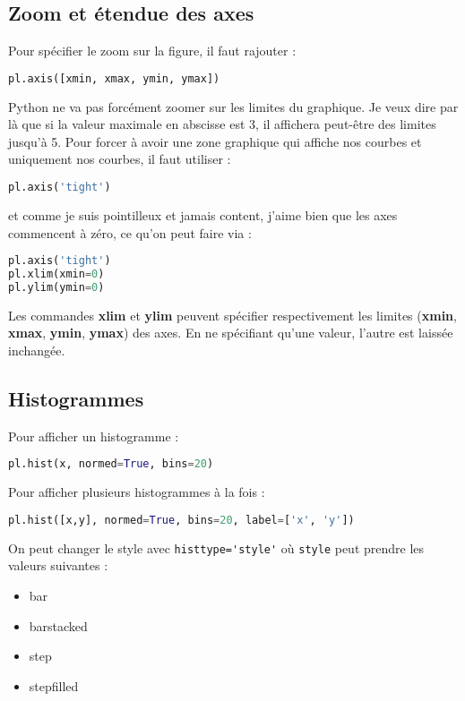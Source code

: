 \documentclass[a4paper,twoside]{article}
\begin{document}
\subsection{Zoom et étendue des axes}

Pour spécifier le zoom sur la figure, il faut rajouter :
\begin{lstlisting}[language=python]
pl.axis([xmin, xmax, ymin, ymax])
\end{lstlisting}

Python ne va pas forcément zoomer sur les limites du graphique. Je veux dire par là que si la valeur maximale en abscisse est 3, il affichera peut-être des limites jusqu'à 5. Pour forcer à avoir une zone graphique qui affiche nos courbes et uniquement nos courbes, il faut utiliser :
\begin{lstlisting}[language=python]
pl.axis('tight')
\end{lstlisting}

et comme je suis pointilleux et jamais content, j'aime bien que les axes commencent à zéro, ce qu'on peut faire via :
\begin{lstlisting}[language=python]
pl.axis('tight')
pl.xlim(xmin=0)
pl.ylim(ymin=0)
\end{lstlisting}

Les commandes \textbf{xlim} et \textbf{ylim} peuvent spécifier respectivement les limites (\textbf{xmin}, \textbf{xmax}, \textbf{ymin}, \textbf{ymax}) des axes. En ne spécifiant qu'une valeur, l'autre est laissée inchangée.


\subsection{Histogrammes}
Pour afficher un histogramme :
\begin{lstlisting}[language=python]
pl.hist(x, normed=True, bins=20)
\end{lstlisting}

Pour afficher plusieurs histogrammes à la fois :
\begin{lstlisting}[language=python]
pl.hist([x,y], normed=True, bins=20, label=['x', 'y'])
\end{lstlisting}

\bigskip

On peut changer le style avec \verb|histtype='style'| où \verb|style| peut prendre les valeurs suivantes :
\begin{itemize}
\item bar
\item barstacked
\item step
\item stepfilled
\end{itemize}
\end{document}

